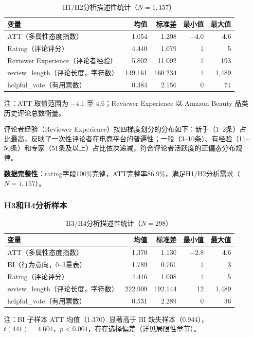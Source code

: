 \begin{table}[htbp]
\centering
\caption{H1/H2分析描述性统计（$N=1{,}157$）}
\label{tab:desc_h12}
\begin{threeparttable}
\begin{tabular}{@{}lrrrr@{}}
\toprule
变量 & 均值 & 标准差 & 最小值 & 最大值 \\
\midrule
ATT（多属性态度指数） & 1.054 & 1.208 & $-$4.0 & 4.6 \\
Rating（评论评分） & 4.440 & 1.079 & 1 & 5 \\
Reviewer Experience（评论者经验） & 5.802 & 11.092 & 1 & 193 \\
review\_length（评论长度，字符数） & 149.161 & 160.234 & 1 & 1{,}489 \\
helpful\_vote（有用票数） & 0.384 & 2.156 & 0 & 74 \\
\bottomrule
\end{tabular}
\begin{tablenotes}
\small
\item 注：ATT 取值范围为 $-4.1$ 至 $4.6$；Reviewer Experience 以 Amazon Beauty 品类历史评论总数衡量。
\end{tablenotes}
\end{threeparttable}
\end{table}

评论者经验（Reviewer Experience）按四梯度划分的分布如下：新手（1--2条）占比最高，反映了一次性评论者在电商平台的普遍性；一般（3--10条）、有经验（11--50条）和专家（51条及以上）占比依次递减，符合评论者活跃度的正偏态分布规律。

\textbf{数据完整性}：rating字段100\%完整，ATT完整率86.9\%，满足H1/H2分析需求（$N=1{,}157$）。

\subsubsection{H3和H4分析样本}

\begin{table}[htbp]
\centering
\caption{H3/H4分析描述性统计（$N=298$）}
\label{tab:desc_h34}
\begin{threeparttable}
\begin{tabular}{@{}lrrrr@{}}
\toprule
变量 & 均值 & 标准差 & 最小值 & 最大值 \\
\midrule
ATT（多属性态度指数） & 1.370 & 1.130 & $-$2.8 & 4.6 \\
BI（行为意向，0--3量表） & 1.789 & 0.761 & 1 & 3 \\
Rating（评论评分） & 4.446 & 1.008 & 1 & 5 \\
review\_length（评论长度，字符数） & 222.909 & 192.144 & 12 & 1{,}489 \\
helpful\_vote（有用票数） & 0.531 & 2.289 & 0 & 36 \\
\bottomrule
\end{tabular}
\begin{tablenotes}
\small
\item 注：BI 子样本 ATT 均值（1.370）显著高于 BI 缺失样本（0.944），$t(441)=4.604$，$p<0.001$，存在选择偏差（详见局限性章节）。
\end{tablenotes}
\end{threeparttable}
\end{table}

